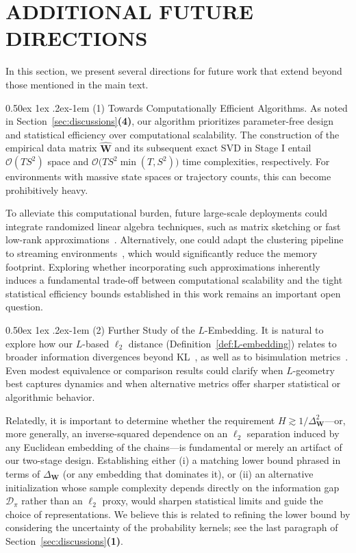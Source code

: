 \documentclass[twoside]{article}
\makeatletter
\renewcommand{\paragraph}{%
  \@startsection{paragraph}{4}%
  {\z@}{0.50ex \@plus 1ex \@minus .2ex}{-1em}%
  {\normalfont\normalsize\bfseries}%
}
\def\mW{{\bm{W}}}
\def\gD{{\mathcal{D}}}
\def\gO{{\mathcal{O}}}
\theoremstyle{plain}
\makeatother
\begin{document}
\newpage
\section{ADDITIONAL FUTURE DIRECTIONS}
\label{app:future}

In this section, we present several directions for future work that extend beyond those mentioned in the main text.

\paragraph{(1) Towards Computationally Efficient Algorithms.}
As noted in Section~\ref{sec:discussions}\textbf{(4)}, our algorithm prioritizes parameter-free design and statistical efficiency over computational scalability. The construction of the empirical data matrix $\widehat{\mW}$ and its subsequent exact SVD in Stage I entail $\gO(TS^2)$ space and $\gO\big(TS^2 \min(T, S^2)\big)$ time complexities, respectively. For environments with massive state spaces or trajectory counts, this can become prohibitively heavy. 

To alleviate this computational burden, future large-scale deployments could integrate randomized linear algebra techniques, such as matrix sketching or fast low-rank approximations~\citep{sketching}. Alternatively, one could adapt the clustering pipeline to streaming environments~\citep{yun2014streaming}, which would significantly reduce the memory footprint.
Exploring whether incorporating such approximations inherently induces a fundamental trade-off between computational scalability and the tight statistical efficiency bounds established in this work remains an important open question.

\paragraph{(2) Further Study of the $L$-Embedding.}
It is natural to explore how our $L$-based $\ell_2$ distance (Definition~\ref{def:L-embedding}) relates to broader information divergences beyond KL~\citep{wang2023divergence}, as well as to bisimulation metrics~\citep{calo2024bisimulation,calo2025bisimulation}.
Even modest equivalence or comparison results could clarify when $L$-geometry best captures dynamics and when alternative metrics offer sharper statistical or algorithmic behavior.

Relatedly, it is important to determine whether the requirement $H \gtrsim 1/\Delta_\mW^2$—or, more generally, an inverse-squared dependence on an $\ell_2$ separation induced by any Euclidean embedding of the chains—is fundamental or merely an artifact of our two-stage design. Establishing either (i) a matching lower bound phrased in terms of $\Delta_\mW$ (or any embedding that dominates it), or (ii) an alternative initialization whose sample complexity depends directly on the information gap $\gD_\pi$ rather than an $\ell_2$ proxy, would sharpen statistical limits and guide the choice of representations.
We believe this is related to refining the lower bound by considering the uncertainty of the probability kernels; see the last paragraph of Section~\ref{sec:discussions}\textbf{(1)}.
\end{document}
